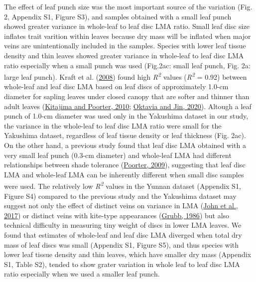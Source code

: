 \documentclass[
  12pt,
  a4paper,
,tablecaptionabove
]{scrartcl}
\begin{document}
The effect of leaf punch size was the most important source of the variation (Fig. 2, Appendix S1, Figure S3), and samples obtained with a small leaf punch showed greater variance in whole-leaf to leaf disc LMA ratio.
Small leaf disc size inflates trait varition within leaves because dry mass will be inflated when major veins are unintentionally included in the samples.
Species with lower leaf tissue density and thin leaves showed greater variance in whole-leaf to leaf disc LMA ratio especially when a small punch was used (Fig.2ac: small leaf punch, Fig. 2a: large leaf punch).
Kraft et al. (\protect\hyperlink{ref-Kraft2008}{2008}) found high \emph{R\textsuperscript{2}} values (\emph{R\textsuperscript{2}} = 0.92) between whole-leaf and leaf disc LMA based on leaf discs of approximately 1.0-cm diameter for sapling leaves under closed canopy that are softer and thinner than adult leaves (\protect\hyperlink{ref-Kitajima2010}{Kitajima and Poorter, 2010}; \protect\hyperlink{ref-Oktavia2020}{Oktavia and Jin, 2020}).
Altough a leaf punch of 1.0-cm diameter was used only in the Yakushima dataset in our study, the variance in the whole-leaf to leaf disc LMA ratio were small for the Yakushima dataset, regardless of leaf tissue density or leaf thickness (Fig. 2ac).
On the other hand, a previous study found that leaf disc LMA obtained with a very small leaf punch (0.3-cm diameter) and whole-leaf LMA had different relationships between shade tolerance (\protect\hyperlink{ref-Poorter2009a}{Poorter, 2009}), suggesting that leaf disc LMA and whole-leaf LMA can be inherently different when small disc samples were used.
The relatively low \emph{R\textsuperscript{2}} values in the Yunnan dataset (Appendix S1, Figure S4) compared to the previous study and the Yakushima dataset may suggest not only the effect of distinct veins on variance in LMA (\protect\hyperlink{ref-John2017}{John et al., 2017}) or distinct veins with kite-type appearances (\protect\hyperlink{ref-Grubb1986}{Grubb, 1986}) but also technical difficulty in measuring tiny weight of discs in lower LMA leaves.
We found that estimates of whole-leaf and leaf disc LMA diverged when total dry mass of leaf discs was small (Appendix S1, Figure S5), and thus species with lower leaf tissue density and thin leaves, which have smaller dry mass (Appendix S1, Table S2), tended to show grater variation in whole leaf to leaf disc LMA ratio especially when we used a smaller leaf punch.
\end{document}
